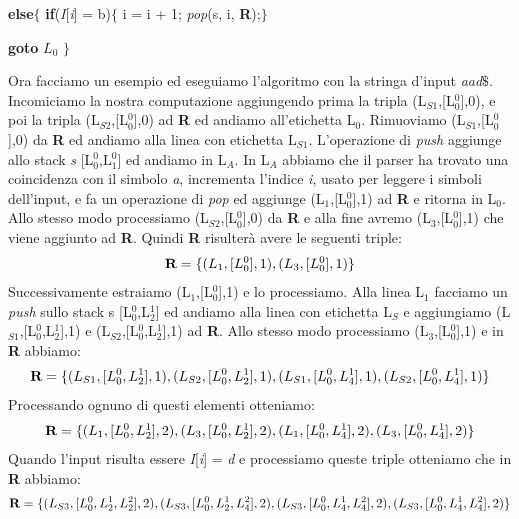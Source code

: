 \hspace{0.2cm} \textbf{else}$\{$ \textbf{if}(\textit{I}[\textit{i}] = b)$\{$ i = i + 1; \textit{pop}(s, i, \textbf{R});$\}$ \par
\hspace{1.5cm}\textbf{goto} $L_0$ $\}$ \par 
\vspace{0.3cm}
Ora facciamo un esempio ed eseguiamo l'algoritmo con la stringa d'input \textit{aad}$\$$. Incomiciamo la nostra computazione aggiungendo prima la tripla (L$_{S1}$,[L$_0^{0}$],0), e poi la tripla (L$_{S2}$,[L$_0^{0}$],0) ad \textbf{R} ed andiamo all'etichetta L$_0$. Rimuoviamo (L$_{S1}$,[L$_0^{0}$],0) da \textbf{R} ed andiamo alla linea con etichetta L$_{S1}$. L'operazione di \textit{push} aggiunge allo stack \textit{s} [L$_0^{0}$,L$_1^{0}$] ed andiamo in L$_A$. In L$_A$ abbiamo che il parser ha trovato una coincidenza con il simbolo \textit{a}, incrementa l'indice \textit{i}, usato per leggere i simboli dell'input, e fa un operazione di \textit{pop} ed aggiunge  (L$_{1}$,[L$_0^{0}$],1) ad \textbf{R} e ritorna in L$_0$. Allo stesso modo processiamo  (L$_{S2}$,[L$_0^{0}$],0) da \textbf{R} e alla fine avremo (L$_{3}$,[L$_0^{0}$],1) che viene aggiunto ad \textbf{R}. Quindi \textbf{R} risulterà avere le seguenti triple:
\begin{align}
	\textbf{R} = \{ (L_1,[L_0^{0}],1), (L_3,[L_0^{0}],1) \} \notag
\end{align}
Successivamente estraiamo (L$_{1}$,[L$_0^{0}$],1) e lo processiamo. Alla linea L$_1$ facciamo un \textit{push} sullo stack s [L$_0^{0}$,L$_2^{1}$] ed andiamo alla linea con etichetta L$_S$ e aggiungiamo (L$_{S1}$,[L$_0^{0}$,L$_2^{1}$],1) e (L$_{S2}$,[L$_0^{0}$,L$_2^{1}$],1) ad \textbf{R}. Allo stesso modo processiamo (L$_{3}$,[L$_0^{0}$],1) e in \textbf{R} abbiamo:
\begin{align}
	\textbf{R} = \{ (L_{S1},[L_0^{0},L_2^{1}],1), (L_{S2},[L_0^{0},L_2^{1}],1), (L_{S1},[L_0^{0},L_4^{1}],1), (L_{S2},[L_0^{0},L_4^{1}],1) \} \notag
\end{align}
Processando ognuno di questi elementi otteniamo:
\begin{align}
	\textbf{R} = \{ (L_{1},[L_0^{0},L_2^{1}],2), (L_{3},[L_0^{0},L_2^{1}],2), (L_{1},[L_0^{0},L_4^{1}],2),  (L_{3},[L_0^{0},L_4^{1}],2) \} \notag
\end{align}
Quando l'input risulta essere \textit{I}[\textit{i}] = \textit{d} e processiamo queste triple otteniamo che in \textbf{R} abbiamo:
\begin{align}
	\textbf{R} = \{ (L_{S3},[L_0^{0},L_2^{1},L_2^{2}],2), (L_{S3},[L_0^{0},L_2^{1},L_4^{2}],2),  (L_{S3},[L_0^{0},L_4^{1},L_4^{2}],2), (L_{S3},[L_0^{0},L_4^{1},L_4^{2}],2) \} \notag
\end{align}
